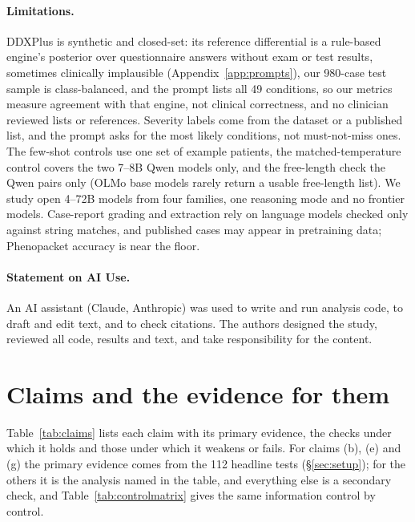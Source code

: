 \documentclass[wcp]{jmlr}
\begin{document}
\paragraph{Limitations.}
DDXPlus is synthetic and closed-set: its reference differential is a rule-based engine's posterior over questionnaire answers without exam or test results, sometimes clinically implausible (Appendix~\ref{app:prompts}), our 980-case test sample is class-balanced, and the prompt lists all 49 conditions, so our metrics measure agreement with that engine, not clinical correctness, and no clinician reviewed lists or references. Severity labels come from the dataset or a published list, and the prompt asks for the most likely conditions, not must-not-miss ones. The few-shot controls use one set of example patients, the matched-temperature control covers the two 7--8B Qwen models only, and the free-length check the Qwen pairs only (OLMo base models rarely return a usable free-length list). We study open 4--72B models from four families, one reasoning mode and no frontier models. Case-report grading and extraction rely on language models checked only against string matches, and published cases may appear in pretraining data; Phenopacket accuracy is near the floor.

\label{pg:mainend}

\paragraph{Statement on AI Use.}
An AI assistant (Claude, Anthropic) was used to write and run analysis code, to draft and edit text, and to check citations. The authors designed the study, reviewed all code, results and text, and take responsibility for the content.



\appendix

\section{Claims and the evidence for them}\label{app:claims}
Table~\ref{tab:claims} lists each claim with its primary evidence, the checks under which it holds and those under which it weakens or fails. For claims (b), (e) and (g) the primary evidence comes from the 112 headline tests (\S\ref{sec:setup}); for the others it is the analysis named in the table, and everything else is a secondary check, and Table~\ref{tab:controlmatrix} gives the same information control by control.
\end{document}
